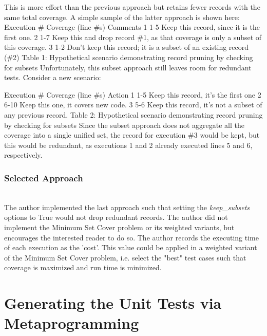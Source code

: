 This is more effort than the previous approach but retains fewer records 
with the same total coverage.  A simple sample of the latter approach is shown here:
Execution \#
Coverage 
(line \#s)
Comments
1
1-5
Keep this record, since it is the first one.
2
1-7
Keep this and drop record \#1, as that coverage is only a subset of this coverage.
3
1-2
Don’t keep this record; it is a subset of an existing record (\#2)
Table 1: Hypothetical scenario demonstrating record pruning by checking for subsets
Unfortunately, this subset approach still leaves room for redundant tests.  
Consider a new scenario:

Execution \#
Coverage 
(line \#s)
Action
1
1-5
Keep this record, it’s the first one
2
6-10
Keep this one, it covers new code.
3
5-6
Keep this record, it’s not a subset of any previous record.
Table 2: Hypothetical scenario demonstrating record pruning by checking for subsets
Since the subset approach does not aggregate all  the coverage into a 
single unified set, the record for execution \#3 would be kept, but this would 
be redundant, as executions 1 and 2 already executed lines 5 and 6, respectively.

\subsubsection{Selected Approach}\label{sec:tuning-2}
\hfill\\

The author implemented the last approach such that setting the \textit{keep\_subsets}
options to True would not drop redundant records.  The author did not implement 
the Minimum Set Cover problem or its weighted variants, but encourages 
the interested reader to do so.  The author records the executing time of each 
execution as the 'cost'. This value could be applied in a weighted 
variant of the Minimum Set Cover problem, i.e. select the "best" test cases
such that coverage is maximized and run time is minimized.
   
\section{Generating the Unit Tests via Metaprogramming}\label{sec:generating-tests}

